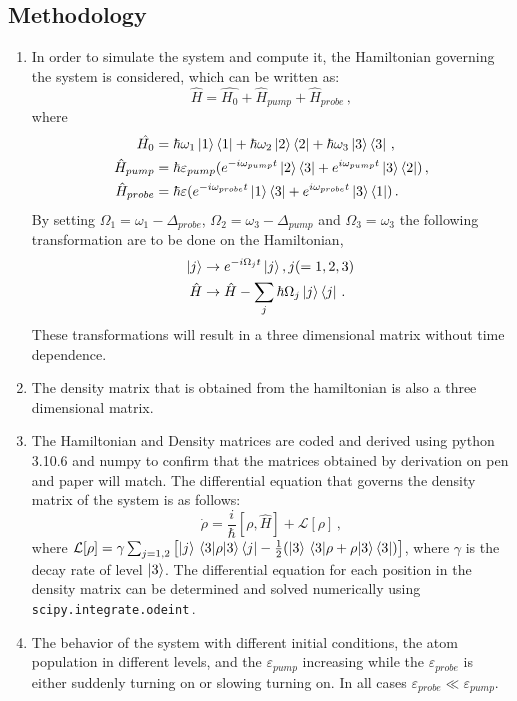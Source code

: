 \documentclass[12pt, a4paper]{article}
\begin{document}
  \subsection{Methodology}
  \begin{enumerate}
    \item In order to simulate the system and compute it, the Hamiltonian governing the system is considered, which can be written as:
    \begin{equation}
      \hat{H} = \hat{H_0} + \hat{H}_{pump} + \hat{H}_{probe}\,, 
    \end{equation}
    where 
    \begin{align}
      \hat{H_0}&=\hbar\omega_1\ket{1}\bra{1}+\hbar\omega_2 \ket{2}\bra{2} + \hbar\omega_3\ket{3}\bra{3}\,,\\
      \hat{H}_{pump} &= \hbar \varepsilon_{pump}(e^{-i\omega_{pump}t}\ket{2}\bra{3} + e^{i\omega_{pump}t}\ket{3}\bra{2})\,,\\
      \hat{H}_{probe} &= \hbar \varepsilon(e^{-i\omega_{probe}t}\ket{1}\bra{3} + e^{i\omega_{probe}t}\ket{3}\bra{1})\,. 
    \end{align}
    By setting \(\Omega_1 = \omega_1 - \Delta_{probe}\), \(\Omega_2 = \omega_3 - \Delta_{pump}\) and \(\Omega_3 = \omega_3\) the following transformation are to be done on the Hamiltonian,
    \begin{align}
      \ket{j} &\rightarrow e^{- i \Omega_j t}\ket{j}, j(=1,2,3)\,\\
      \hat{H} &\rightarrow \hat{H} - \sum_{j} \hbar \Omega_j \ket{j}\bra{j}\,.
    \end{align}
    These transformations will result in a three dimensional matrix without time dependence. 
    \item The density matrix that is obtained from the hamiltonian is also a three dimensional matrix.
    \item  The Hamiltonian and Density matrices are coded and derived using python 3.10.6 and numpy to confirm that the matrices obtained by derivation on pen and paper will match. The differential equation that governs the density matrix of the system is as follows:
    \begin{equation}
      \dot{\rho} = \frac{i}{\hbar}\left[\rho,\hat{H}\right] + \mathcal{L} [\rho]\,,
    \end{equation}
    where \(\mathcal{L}[\rho] = \gamma \sum_{j = 1,2}\left[\ket{j}\ev{\rho}{3}\bra{j}-\frac{1}{2}(\ket{3}\ev{\rho+\rho}{3}\bra{3})\right]\), where \(\gamma\) is the decay rate of level \(\ket{3}\). The differential equation for each position in the density matrix can be determined and solved numerically using \lstinline{scipy.integrate.odeint}\,.
    \item The behavior of the system with different initial conditions, the atom population in different levels, and the \(\varepsilon_{pump}\) increasing while the \(\varepsilon_{probe}\) is either suddenly turning on or slowing turning on. In all cases \(\varepsilon_{probe} \ll \varepsilon_{pump}\).
  \end{enumerate}
\end{document}
